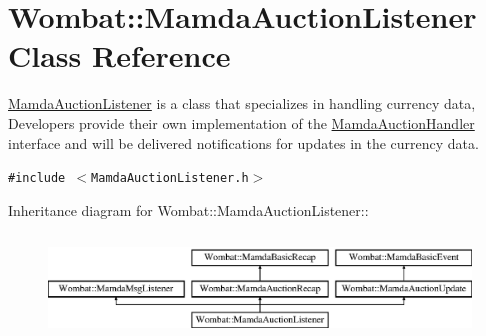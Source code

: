 \hypertarget{classWombat_1_1MamdaAuctionListener}{
\section{Wombat::Mamda\-Auction\-Listener Class Reference}
\label{classWombat_1_1MamdaAuctionListener}
}
\hyperlink{classWombat_1_1MamdaAuctionListener}{Mamda\-Auction\-Listener} is a class that specializes in handling currency data, Developers provide their own implementation of the \hyperlink{classWombat_1_1MamdaAuctionHandler}{Mamda\-Auction\-Handler} interface and will be delivered notifications for updates in the currency data.  


{\tt \#include $<$Mamda\-Auction\-Listener.h$>$}

Inheritance diagram for Wombat::Mamda\-Auction\-Listener::\begin{figure}[H]
\begin{center}
\leavevmode
\includegraphics[height=2.81407cm]{classWombat_1_1MamdaAuctionListener}
\end{center}
\end{figure}
